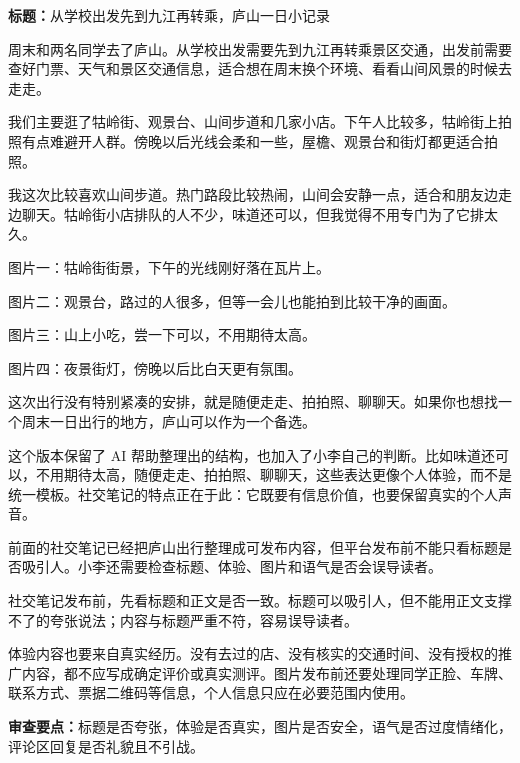 \begin{aibox}
\textbf{标题：}从学校出发先到九江再转乘，庐山一日小记录

周末和两名同学去了庐山。从学校出发需要先到九江再转乘景区交通，出发前需要查好门票、天气和景区交通信息，适合想在周末换个环境、看看山间风景的时候去走走。

我们主要逛了牯岭街、观景台、山间步道和几家小店。下午人比较多，牯岭街上拍照有点难避开人群。傍晚以后光线会柔和一些，屋檐、观景台和街灯都更适合拍照。

我这次比较喜欢山间步道。热门路段比较热闹，山间会安静一点，适合和朋友边走边聊天。牯岭街小店排队的人不少，味道还可以，但我觉得不用专门为了它排太久。

图片一：牯岭街街景，下午的光线刚好落在瓦片上。

图片二：观景台，路过的人很多，但等一会儿也能拍到比较干净的画面。

图片三：山上小吃，尝一下可以，不用期待太高。

图片四：夜景街灯，傍晚以后比白天更有氛围。

这次出行没有特别紧凑的安排，就是随便走走、拍拍照、聊聊天。如果你也想找一个周末一日出行的地方，庐山可以作为一个备选。
\end{aibox}

这个版本保留了 AI 帮助整理出的结构，也加入了小李自己的判断。比如味道还可以，不用期待太高，随便走走、拍拍照、聊聊天，这些表达更像个人体验，而不是统一模板。社交笔记的特点正在于此：它既要有信息价值，也要保留真实的个人声音。

前面的社交笔记已经把庐山出行整理成可发布内容，但平台发布前不能只看标题是否吸引人。小李还需要检查标题、体验、图片和语气是否会误导读者。

\enlargethispage{4\baselineskip}
\begin{critiquebox}
社交笔记发布前，先看标题和正文是否一致。标题可以吸引人，但不能用正文支撑不了的夸张说法；内容与标题严重不符，容易误导读者\footnotemark。

体验内容也要来自真实经历。没有去过的店、没有核实的交通时间、没有授权的推广内容，都不应写成确定评价或真实测评\footnotemark。图片发布前还要处理同学正脸、车牌、联系方式、票据二维码等信息，个人信息只应在必要范围内使用\footnotemark。

\textbf{审查要点：}标题是否夸张，体验是否真实，图片是否安全，语气是否过度情绪化，评论区回复是否礼貌且不引战。
\end{critiquebox}
\addtocounter{footnote}{-3}



